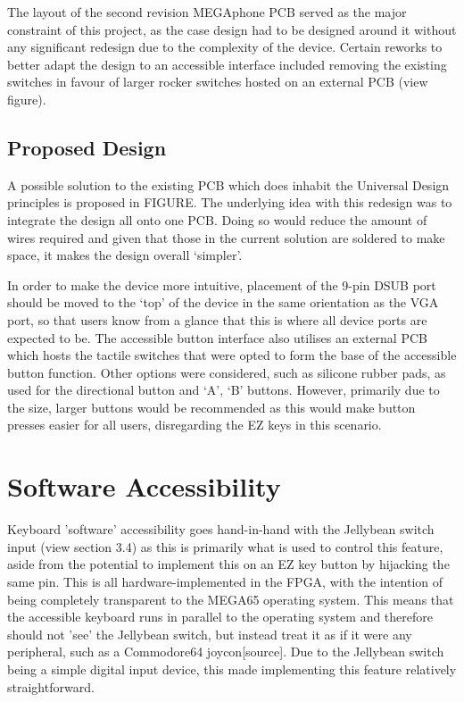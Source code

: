 The layout of the second revision MEGAphone PCB served as the major constraint of this project, as the case design had to be designed around it without any significant redesign due to the complexity of the device. 
Certain reworks to better adapt the design to an accessible interface included removing the existing switches in favour of larger rocker switches hosted on an external PCB (view figure).

\subsection{Proposed Design}

A possible solution to the existing PCB which does inhabit the Universal Design principles is proposed in FIGURE. 
The underlying idea with this redesign was to integrate the design all onto one PCB. 
Doing so would reduce the amount of wires required and given that those in the current solution are soldered to make space, it makes the design overall ‘simpler’.

In order to make the device more intuitive, placement of the 9-pin DSUB port should be moved to the ‘top’ of the device in the same orientation as the VGA port, so that users know from a glance that this is where all device ports are expected to be.
The accessible button interface also utilises an external PCB which hosts the tactile switches that were opted to form the base of the accessible button function. 
Other options were considered, such as silicone rubber pads, as used for the directional button and ‘A’, ‘B’ buttons. 
However, primarily due to the size, larger buttons would be recommended as this would make button presses easier for all users, disregarding the EZ keys in this scenario.


\section{Software Accessibility}
Keyboard 'software' accessibility goes hand-in-hand with the Jellybean switch input (view section 3.4) as this is primarily what is used to control this feature, aside from the potential to implement this on an EZ key button by hijacking the same pin.
This is all hardware-implemented in the FPGA, with the intention of being completely transparent to the MEGA65 operating system.
This means that the accessible keyboard runs in parallel to the operating system and therefore should not 'see' the Jellybean switch, but instead treat it as if it were any peripheral, such as a Commodore64 joycon[source].
Due to the Jellybean switch being a simple digital input device, this made implementing this feature relatively straightforward.

